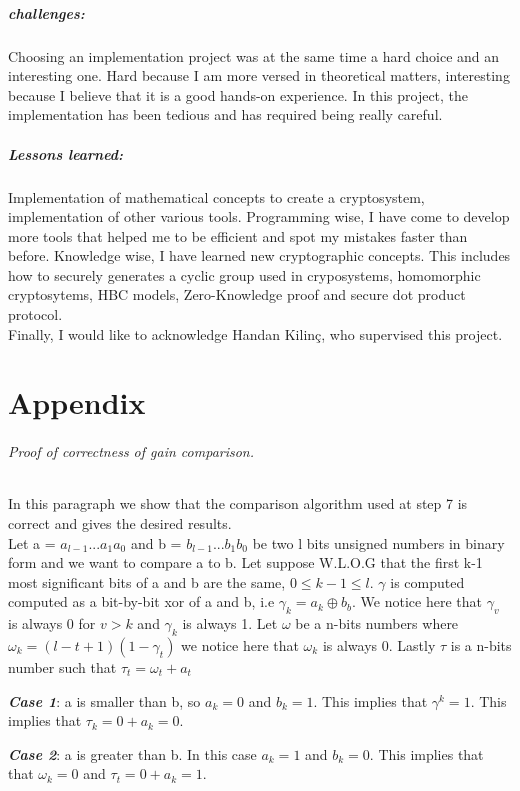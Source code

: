 \documentclass[11pt, a4paper, oneside, openright]{book} %
\begin{document}
\paragraph{challenges:} Choosing an implementation project was at the same time a hard choice and an interesting one. Hard because I am more versed in theoretical matters, interesting because I believe that it is a good hands-on experience. In this project, the implementation has been tedious and has required being really careful.
\paragraph{Lessons learned:} Implementation of mathematical concepts to create a cryptosystem, implementation of other various tools. Programming wise, I have come to develop more tools that helped me to be efficient and spot my mistakes faster than before. Knowledge wise, I have learned new cryptographic concepts. This includes how to securely generates a cyclic group used in cryposystems, homomorphic cryptosytems, HBC models, Zero-Knowledge proof and secure dot product protocol.\\
Finally, I would like to acknowledge Handan Kilin\c{c}, who supervised this project.

\chapter{Appendix}
\subparagraph{Proof of correctness of gain comparison.}
In this paragraph we show that the comparison algorithm used at step 7 is correct and gives the desired results.\\
Let a = $a_{l-1}...a_{1}a_{0}$ and b = $b_{l-1}...b_{1}b_{0}$ be two l bits unsigned numbers in binary form and we want to compare a to b. Let suppose W.L.O.G that the first k-1 most significant bits of a and b are the same, $0\leq k-1 \leq l$. $\gamma$ is computed computed as a bit-by-bit xor of a and b, i.e $\gamma_k = a_k \oplus b_b$. We notice here that $\gamma _v$ is always 0 for $v > k$ and  $\gamma _k$ is always 1. Let $\omega$ be a n-bits numbers where $\omega_k = (l-t+1)(1-\gamma_t)$ we notice here that $\omega _k$ is always 0. Lastly $\tau$ is a n-bits number such that $\tau_t = \omega_t + a_t$

\textbf{\textit{Case 1}}: a is smaller than b, so $a_{k} = 0 $ and $b_{k} = 1$. This implies that $\gamma^{k} = 1$. This implies that $\tau_{k}= 0 + a_{k} = 0$. 

\textbf{\textit{Case 2}}: a is greater than b. In this case $a_{k} = 1 $ and $b_{k} = 0$. This implies that that $\omega_{k} = 0$ and $\tau_{t}= 0 + a_k = 1$. 
\end{document}
